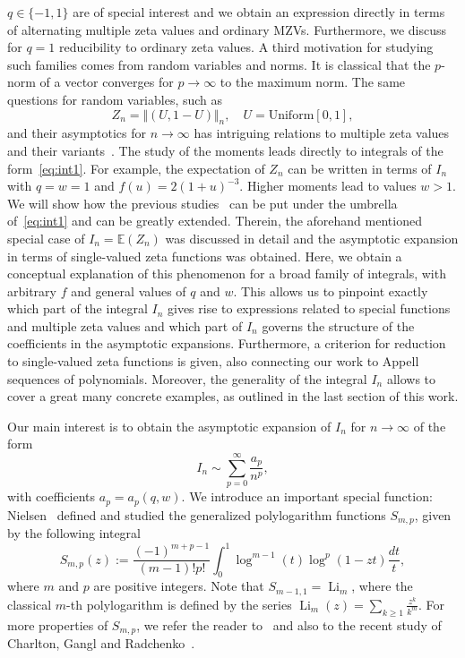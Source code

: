 \documentclass[10pt,reqno,a4paper]{amsart}%
\theoremstyle{definition}
\DeclareMathOperator{\Li}{Li}
\newcommand{\E}{\ensuremath{\mathbb{E}}} %
\begin{document}
$q\in\{-1,1\}$ are of special interest and we obtain an expression directly in
terms of alternating multiple zeta values and ordinary MZVs. Furthermore, we
discuss for $q=1$ reducibility to ordinary zeta values. A third motivation for
studying such families comes from random variables and norms. It is classical
that the $p$-norm of a vector converges for $p\rightarrow\infty$ to the
maximum norm. The same questions for random variables, such as
\begin{equation}
Z_{n}=\Vert(U,1-U)\Vert_{n},\quad U=\text{Uniform}[0,1],\label{def:norm}%
\end{equation}
and their asymptotics for $n\rightarrow\infty$ has intriguing relations to
multiple zeta values and their variants~\cite{HKLL2020}. The study of the
moments leads directly to integrals of the form~\eqref{eq:int1}. For example,
the expectation of $Z_{n}$ can be written in terms of $I_{n}$ with $q=w=1$ and
$f(u)=2(1+u)^{-3}$. Higher moments lead to values $w>1$. We will show how the
previous studies~\cite{HKLL2020} can be put under the umbrella
of~\eqref{eq:int1} and can be greatly extended. Therein, the aforehand mentioned special case of $I_n=\E(Z_n)$ was discussed in detail and the asymptotic expansion in terms of single-valued zeta functions was obtained. Here, we obtain a conceptual explanation of this phenomenon for a broad family of integrals, with arbitrary $f$ and general values of $q$ and $w$. This allows us to pinpoint exactly which part of the integral $I_n$ gives rise to expressions related to special functions and multiple zeta values and which part of $I_n$ governs the structure of the coefficients in the asymptotic expansions. 
%
%
Furthermore, a criterion for reduction to single-valued zeta functions is given, also connecting our work to Appell sequences of polynomials. Moreover, the generality of the integral $I_n$ allows to cover a great many concrete examples, as outlined in the last section of this work.

\smallskip

Our main interest is to obtain the asymptotic expansion of $I_{n}$ for $n
\to\infty$ of the form
\[
I_{n} \sim\sum_{p=0}^{\infty} \frac{a_{p}}{n^{p}},
\]
with coefficients $a_{p}=a_{p}(q,w)$. We introduce an important special
function: Nielsen~\cite{Nielsen} defined and studied the generalized
polylogarithm functions $S_{m,p}$, given by the following integral
\begin{equation}
S_{m,p}(z) := \frac{(-1)^{m+p-1}}{(m-1)! p!}\int_{0}^{1} \log^{m-1}(t)
\log^{p}(1-zt) \frac{dt}{t},
\end{equation}
where $m$ and $p$ are positive integers. Note that $S_{m-1,1}=\Li_{m}$, where
the classical $m$-th polylogarithm is defined by the series $\Li_{m}%
(z)=\sum_{k\ge1}\frac{z^{k}}{k^{m}}$. For more properties of $S_{m,p}$, we
refer the reader to~\cite{Kolbig} and also to the recent study of Charlton,
Gangl and Radchenko~\cite{Charlton}.
\end{document}
